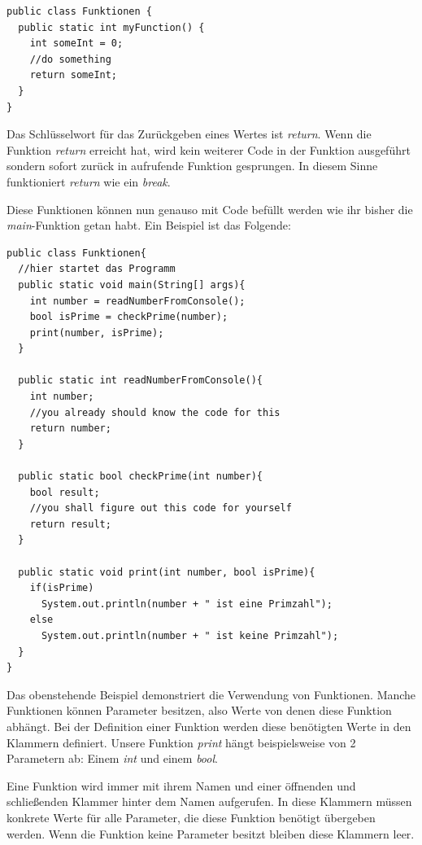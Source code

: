 \begin{minipage}{\textwidth}
\begin{lstlisting}
public class Funktionen {
  public static int myFunction() {
    int someInt = 0;
    //do something
    return someInt;
  }
}
\end{lstlisting}
\end{minipage}

Das Schlüsselwort für das Zurückgeben eines Wertes ist \textit{return}. Wenn die Funktion \textit{return} erreicht hat, wird kein weiterer Code in der Funktion ausgeführt sondern sofort zurück in aufrufende Funktion gesprungen. In diesem Sinne funktioniert \textit{return} wie ein \textit{break}.

Diese Funktionen können nun genauso mit Code befüllt werden wie ihr bisher die \textit{main}-Funktion getan habt. Ein Beispiel ist das Folgende:

\begin{minipage}{\textwidth}
\begin{lstlisting}
public class Funktionen{
  //hier startet das Programm
  public static void main(String[] args){
    int number = readNumberFromConsole();
    bool isPrime = checkPrime(number);
    print(number, isPrime);
  }      
  
  public static int readNumberFromConsole(){
    int number;
    //you already should know the code for this
    return number;
  }
  
  public static bool checkPrime(int number){
    bool result;
    //you shall figure out this code for yourself
    return result;
  }
  
  public static void print(int number, bool isPrime){
    if(isPrime)
      System.out.println(number + " ist eine Primzahl");
    else
      System.out.println(number + " ist keine Primzahl");
  }
}
\end{lstlisting}
\end{minipage}

Das obenstehende Beispiel demonstriert die Verwendung von Funktionen. Manche Funktionen können Parameter besitzen, also Werte von denen diese Funktion abhängt. Bei der Definition einer Funktion werden diese benötigten Werte in den Klammern definiert. Unsere Funktion \textit{print} hängt beispielsweise von 2 Parametern ab: Einem \textit{int} und einem \textit{bool}.

Eine Funktion wird immer mit ihrem Namen und einer öffnenden und schließenden Klammer hinter dem Namen aufgerufen. In diese Klammern müssen konkrete Werte für alle Parameter, die diese Funktion benötigt übergeben werden. Wenn die Funktion keine Parameter besitzt bleiben diese Klammern leer.

